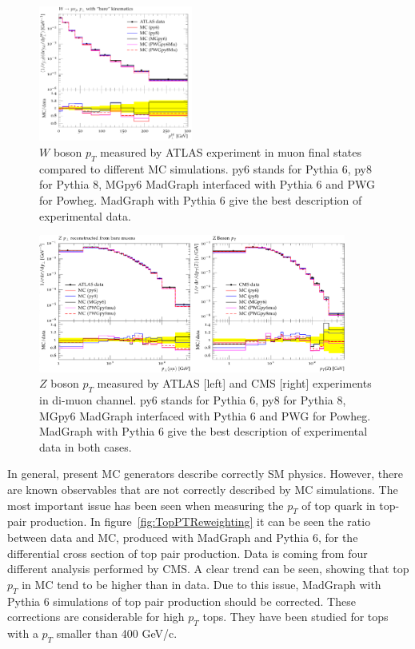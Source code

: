 \begin{figure}[!Hhtbp]
  \begin{center}
    \includegraphics[width=0.45\textwidth]{figs/Wpt_rivet.png}
    \caption{$W$ boson $p_{T}$ measured by ATLAS experiment in muon final states compared to different MC simulations. py6 stands for Pythia 6, py8 for Pythia 8, MGpy6 MadGraph interfaced with Pythia 6 and PWG for Powheg. MadGraph with Pythia 6 give the best description of experimental data.}
    \label{fig:WVal}
  \end{center}
\end{figure}

\begin{figure}[!Hhtbp]
  \begin{center}
    \includegraphics[width=0.9\textwidth]{figs/Zpt_rivet.png}
    \caption{$Z$ boson $p_{T}$ measured by ATLAS [left] and CMS [right] experiments in di-muon channel. py6 stands for Pythia 6, py8 for Pythia 8, MGpy6 MadGraph interfaced with Pythia 6 and PWG for Powheg. MadGraph with Pythia 6 give the best description of experimental data in both cases.}
    \label{fig:ZVal}
  \end{center}
\end{figure}

In general, present MC generators describe correctly SM physics. However, there are known observables that are not correctly described by MC simulations. The most important issue has been seen when measuring the $p_{T}$ of top quark in top-pair production. In figure~\ref{fig:TopPTReweighting} it can be seen the ratio between data and MC, produced with MadGraph and Pythia 6, for the differential cross section of top pair production. Data is coming from four different analysis performed by CMS. A clear trend can be seen, showing that top $p_{T}$ in MC tend to be higher than in data. Due to this issue, MadGraph with Pythia 6 simulations of top pair production should be corrected. These corrections are considerable for high $p_{T}$ tops. They have been studied for tops with a $p_{T}$ smaller than 400 GeV/c.

